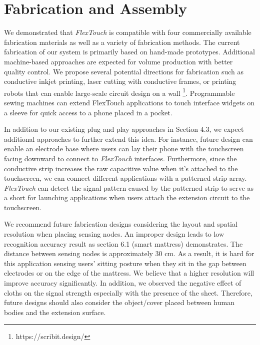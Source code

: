 \section{Fabrication and Assembly}
We demonstrated that \textit{FlexTouch} is compatible with four commercially available fabrication materials as well as a variety of fabrication methods. The current fabrication of our system is primarily based on hand-made prototypes. Additional machine-based approaches are expected for volume production with better quality control. We propose several potential directions for fabrication such as conductive inkjet printing, laser cutting with conductive frames, or printing robots that can enable large-scale circuit design on a wall \footnote{https://scribit.design/}. Programmable sewing machines can extend FlexTouch applications to touch interface widgets on a sleeve for quick access to a phone placed in a pocket.

In addition to our existing plug and play approaches in Section $4.3$, we expect additional approaches to further extend this idea. For instance, future design can enable an electrode base where users can lay their phone with the touchscreen facing downward to connect to \textit{FlexTouch} interfaces. Furthermore, since the conductive strip increases the raw capacitive value when it's attached to the touchscreen, we can connect different applications with a patterned strip array. \textit{FlexTouch} can detect the signal pattern caused by the patterned strip to serve as a short for launching applications when users attach the extension circuit to the touchscreen.

We recommend future fabrication designs considering the layout and spatial resolution when placing sensing nodes. An improper design leads to low recognition accuracy result as section 6.1 (smart mattress) demonstrates. The distance between sensing nodes is approximately 30 cm. As a result, it is hard for this application sensing users' sitting posture when they sit in the gap between electrodes or on the edge of the mattress. We believe that a higher resolution will improve accuracy significantly. In addition, we observed the negative effect of cloths on the signal strength especially with the presence of the sheet. Therefore, future designs should also consider the object/cover placed between human bodies and the extension surface.

